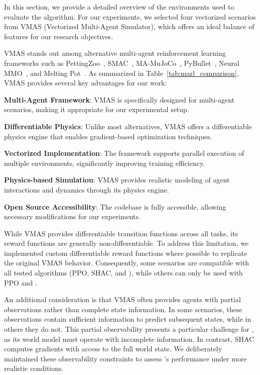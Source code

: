 In this section, we provide a detailed overview of the environments used to evaluate the \fname{} algorithm. For our experiments, we selected four vectorized scenarios from VMAS (Vectorized Multi-Agent Simulator), which offers an ideal balance of features for our research objectives.

VMAS stands out among alternative multi-agent reinforcement learning frameworks such as PettingZoo~\cite{DBLP:conf/icml/PettingZoo}, SMAC~\cite{DBLP:conf/icml/ZhangZLZ20}, MA-MuJoCo~\cite{DBLP:conf/aaai/GuptaK0G20}, PyBullet~\cite{DBLP:journals/corr/abs-1710-06347}, Neural MMO~\cite{DBLP:conf/aaai/DiehlB21}, and Melting Pot~\cite{DBLP:conf/icml/GuptaK0G20}. As summarized in Table~\ref{tab:marl_comparison}, VMAS provides several key advantages for our work:

\begin{compactitem}
    \item \textbf{Multi-Agent Framework}: VMAS is specifically designed for multi-agent scenarios, making it appropriate for our experimental setup.
    \item \textbf{Differentiable Physics}: Unlike most alternatives, VMAS offers a differentiable physics engine that enables gradient-based optimization techniques.
    \item \textbf{Vectorized Implementation}: The framework supports parallel execution of multiple environments, significantly improving training efficiency.
    \item \textbf{Physics-based Simulation}: VMAS provides realistic modeling of agent interactions and dynamics through its physics engine.
    \item \textbf{Open Source Accessibility}: The codebase is fully accessible, allowing necessary modifications for our experiments.
\end{compactitem}

While VMAS provides differentiable transition functions across all tasks, its reward functions are generally non-differentiable. To address this limitation, we implemented custom differentiable reward functions where possible to replicate the original VMAS behavior. Consequently, some scenarios are compatible with all tested algorithms (PPO, SHAC, and \fname{}), while others can only be used with PPO and \fname{}.

An additional consideration is that VMAS often provides agents with partial observations rather than complete state information. In some scenarios, these observations contain sufficient information to predict subsequent states, while in others they do not. This partial observability presents a particular challenge for \fname{}, as its world model must operate with incomplete information. In contrast, SHAC computes gradients with access to the full world state. We deliberately maintained these observability constraints to assess \fname{}'s performance under more realistic conditions.

